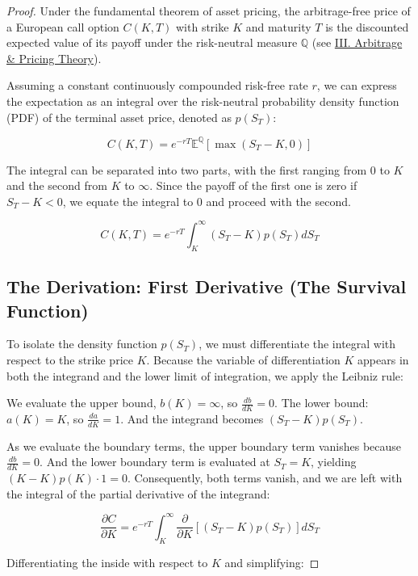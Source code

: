 \documentclass[12pt,oneside]{report}
\theoremstyle{definition}
\theoremstyle{remark}
\begin{document}
\begin{proof}
Under the fundamental theorem of asset pricing, the arbitrage-free price of a European call option $C(K, T)$ with strike $K$ and maturity $T$ is the discounted expected value of its payoff under the risk-neutral measure $\mathbb{Q}$ (see \hyperref[sec:glossary_arbitrage_pricing_theory]{III. Arbitrage \& Pricing Theory}).

Assuming a constant continuously compounded risk-free rate $r$, we can express the expectation as an integral over the risk-neutral probability density function (PDF) of the terminal asset price, denoted as $p(S_T)$:

$$C(K, T) = e^{-rT} \mathbb{E}^{\mathbb{Q}}[\max(S_T - K, 0)]$$

The integral can be separated into two parts, with the first ranging from $0$ to $K$ and the second from $K$ to $\infty$. Since the payoff of the first one is zero if $S_T - K < 0$, we equate the integral to 0 and proceed with the second.

\begin{equation}
C(K, T) = e^{-rT} \int_{K}^{\infty} (S_T - K) p(S_T) dS_T
\label{eq:expected_payoff_call}
\end{equation}
\subsection{The Derivation: First Derivative (The Survival Function)}

To isolate the density function $p(S_T)$, we must differentiate the integral with respect to the strike price $K$. Because the variable of differentiation $K$ appears in both the integrand and the lower limit of integration, we apply the Leibniz rule:

We evaluate the upper bound, $b(K) = \infty$, so $\frac{db}{dK} = 0$. The lower bound: $a(K) = K$, so $\frac{da}{dK} = 1$.
And the integrand becomes $(S_T - K)p(S_T)$.

As we evaluate the boundary terms, the upper boundary term vanishes because $\frac{db}{dK} = 0$. And the lower boundary term is evaluated at $S_T = K$, yielding $(K - K)p(K) \cdot 1 = 0$. Consequently, both terms vanish, and we are left with the integral of the partial derivative of the integrand:

$$\frac{\partial C}{\partial K} = e^{-rT} \int_{K}^{\infty} \frac{\partial}{\partial K} \left[ (S_T - K) p(S_T) \right] dS_T$$

Differentiating the inside with respect to $K$ and simplifying:



\end{proof}
\end{document}
